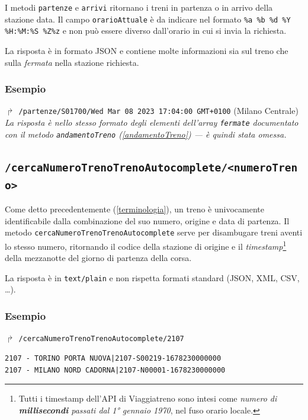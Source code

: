 \documentclass[12pt,italian]{report}
\begin{document}
I metodi \texttt{partenze} e \texttt{arrivi} ritornano i treni in
partenza o in arrivo della stazione data.  Il campo
\texttt{orarioAttuale} è da indicare nel formato \texttt{\%a \%b \%d
    \%Y \%H:\%M:\%S \%Z\%z} e non può essere diverso dall'orario in
cui si invia la richiesta.

La risposta è in formato JSON e contiene molte informazioni sia sul
treno che sulla \textit{fermata} nella stazione richiesta.

\subsubsection{Esempio}

$\Rsh$ \texttt{/partenze/S01700/Wed Mar 08 2023 17:04:00 GMT+0100}
\hfill (Milano Centrale) \\

\noindent \textit{La risposta è nello stesso formato degli elementi
    dell'array \texttt{fermate} documentato con il metodo
    \texttt{andamentoTreno} (\ref{andamentoTreno}) --- è quindi stata
    omessa.}

\subsection{\texttt{/cercaNumeroTrenoTrenoAutocomplete/<numeroTreno>}}
\label{trenoAutocomplete}

Come detto precedentemente (\ref{terminologia}), un treno è
univocamente identificabile dalla combinazione del suo numero, origine
e data di partenza.  Il metodo
\texttt{cerca\-Numero\-Treno\-Treno\-Autocomplete} serve per
disambugare treni aventi lo stesso numero, ritornando il codice della
stazione di origine e il
\textit{timestamp}\footnote{\label{timestamp}Tutti i timestamp
    dell'API di Viaggiatreno sono intesi come \textit{numero di
        \textbf{millisecondi} passati dal 1° gennaio 1970}, nel fuso
    orario locale.} della mezzanotte del giorno di partenza della
corsa.

La risposta è in \texttt{text/plain} e non rispetta formati standard
(JSON, XML, CSV, \dots).

\subsubsection{Esempio}

$\Rsh$ \texttt{/cercaNumeroTrenoTrenoAutocomplete/2107}

\begin{verbatim}
2107 - TORINO PORTA NUOVA|2107-S00219-1678230000000
2107 - MILANO NORD CADORNA|2107-N00001-1678230000000
\end{verbatim}
\end{document}
